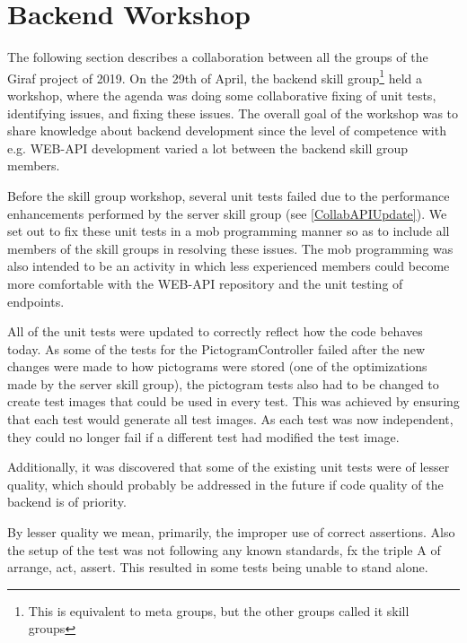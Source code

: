 \section{Backend Workshop} \label{SEC:workshopAPIcollab}
The following section describes a collaboration between all the groups of the Giraf project of 2019. 
On the 29th of April, the backend skill group\footnote{This is equivalent to meta groups, but the other groups called it skill groups} held a workshop, where the agenda was doing some collaborative fixing of unit tests, identifying issues, and fixing these issues. 
The overall goal of the workshop was to share knowledge about backend development since the level of competence with e.g. WEB-API development varied a lot between the backend skill group members.

Before the skill group workshop, several unit tests failed due to the performance enhancements performed by the server skill group (see \autoref{CollabAPIUpdate}). 
We set out to fix these unit tests in a mob programming manner so as to include all members of the skill groups in resolving these issues.
The mob programming was also intended to be an activity in which less experienced members could become more comfortable with the WEB-API repository and the unit testing of endpoints.

All of the unit tests were updated to correctly reflect how the code behaves today.
As some of the tests for the PictogramController failed after the new changes were made to how pictograms were stored (one of the optimizations made by the server skill group), the pictogram tests also had to be changed to create test images that could be used in every test.
This was achieved by ensuring that each test would generate all test images.
As each test was now independent, they could no longer fail if a different test had modified the test image.

Additionally, it was discovered that some of the existing unit tests were of lesser quality, which should probably be addressed in the future if code quality of the backend is of priority.

By lesser quality we mean, primarily, the improper use of correct assertions. 
Also the setup of the test was not following any known standards, fx the triple A of arrange, act, assert. 
This resulted in some tests being unable to stand alone.

